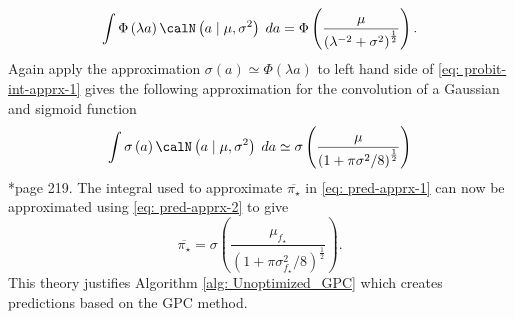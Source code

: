 \begin{equation} \label{eq: probit-int-apprx-1}
    \int \Phi \left( \lambda a \right) \calN \left( a \mid \mu , \sigma^2 \right) \; da = \Phi \left( \frac{\mu}{\left( \lambda^{-2} + \sigma^2 \right)^{\frac{1}{2}}} \right).
\end{equation}
Again apply the approximation $\sigma \left( a \right) \simeq \Phi \left( \lambda a \right)$ to left hand side of \ref{eq: probit-int-apprx-1} gives the following approximation for the convolution of a Gaussian and sigmoid function
\begin{equation} \label{eq: pred-apprx-2}
    \int \sigma \left( a \right) \calN \left( a \mid \mu , \sigma^2 \right) \; da \simeq \sigma \left( \frac{\mu}{\left( 1 + \pi \sigma^2 / 8 \right)^{\frac{1}{2}}} \right)
\end{equation}
\cite{BishopChristopherM2006Pram}*{page 219}. The integral used to approximate $\overline{\pi_{\star}}$ in \ref{eq: pred-apprx-1} can now be approximated using \ref{eq: pred-apprx-2} to give
\begin{equation*} \label{eq: pred-apprx-3}
    \overline{\pi_{\star}} = \sigma \left( \frac{\mu_{f_{\star}}}{\left( 1 + \pi \sigma_{f_{\star}}^2 / 8 \right)^{\frac{1}{2}}} \right).
\end{equation*}
This theory justifies Algorithm \ref{alg: Unoptimized_GPC} which creates predictions based on the GPC method.

